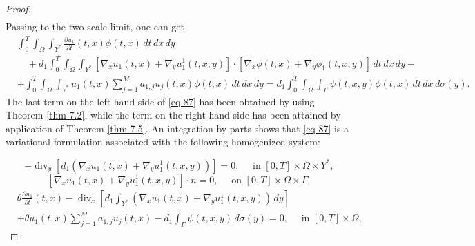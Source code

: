 \begin{proof}
\begin{equation}
\begin{aligned}
\end{aligned}
\label{eq 86}\end{equation}
Passing to the two-scale limit, one can get
\begin{equation}
\begin{aligned}
&\int_{0}^{T} \int_{\Omega} \int_{Y^{*}} \frac{\partial u_{1}}{\partial t}(t, x) \phi(t, x) \, d  t \, d  x \, d  y \\
&\quad+d_{1} \int_{0}^{T} \int_{\Omega} \int_{Y^{*}}\left[\nabla_{x} u_{1}(t, x)+\nabla_{y} u_{1}^{1}(t, x, y)\right] \cdot\left[\nabla_{x} \phi(t, x)+\nabla_{y} \phi_{1}(t, x, y)\right] \, d  t \, d  x \, d  y+\\&+\int_{0}^{T} \int_{\Omega} \int_{Y^{*}} u_{1}(t, x) \sum_{j=1}^{M} a_{1, j} u_{j}(t, x) \phi(t, x) \, d  t \, d  x \, d  y= d_{1} \int_{0}^{T} \int_{\Omega} \int_{\Gamma} \psi(t, x, y) \phi(t, x) \, d  t \, d  x \, d  \sigma(y).
\end{aligned}
\label{eq 87}\end{equation}
The last term on the left-hand side of \eqref{eq 87} has been obtained by using Theorem \eqref{thm 7.2}, while the term on the right-hand side has been attained by application of Theorem \eqref{thm 7.5}. An integration by parts shows that \eqref{eq 87} is a variational formulation associated with the following homogenized system:

\begin{equation}
  -\operatorname{div}_{y}\left[d_{1}\left(\nabla_{x} u_{1}(t, x)+\nabla_{y} u_{1}^{1}(t, x, y)\right)\right]=0, \quad \text { in }[0, T] \times \Omega \times Y^{*},
\label{eq 88}\end{equation}
\begin{equation}
 {\left[\nabla_{x} u_{1}(t, x)+\nabla_{y} u_{1}^{1}(t, x, y)\right] \cdot n=0, \quad \text { on }[0, T] \times \Omega \times \Gamma},
\label{eq 89}\end{equation}
\begin{equation}
\begin{aligned}
&\theta \frac{\partial u_{1}}{\partial t}(t, x)-\operatorname{div}_{x}\left[d_{1} \int_{Y^{*}}\left(\nabla_{x} u_{1}(t, x)+\nabla_{y} u_{1}^{1}(t, x, y)\right) \, d  y\right] \\&+\theta u_{1}(t, x) \sum_{j=1}^{M} a_{1, j} u_{j}(t, x)-d_{1} \int_{\Gamma} \psi(t, x, y) \, d  \sigma(y)=0, \quad \text { in }[0, T] \times \Omega,
\end{aligned}
\label{eq 90}\end{equation}


\end{proof}

